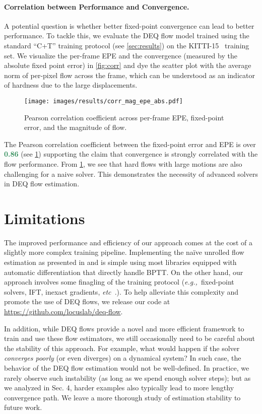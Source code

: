 \documentclass[10pt,twocolumn,letterpaper]{article}
\def\eg{\textit{e.g.,~}}
\def\etc{\textit{etc~}}
\begin{document}
\vspace{-.3cm}
\paragraph{Correlation between Performance and Convergence.} A potential question is whether better fixed-point convergence can lead to better performance. To tackle this, we evaluate the DEQ flow model trained using the standard ``C+T'' training protocol (see \cref{sec:results}) on the KITTI-15~\cite{kitti} training set. We visualize the per-frame EPE and the convergence (measured by the absolute fixed point error) in \cref{fig:corr} and dye the scatter plot with the average norm of per-pixel flow across the frame, which can be understood as an indicator of hardness due to the large displacements. 
\begin{figure}
    \centering
    \texttt{[image: images/results/corr\_mag\_epe\_abs.pdf]}
    \vspace{-0.3cm}
    \caption{Pearson correlation coefficient across per-frame EPE, fixed-point error, and the magnitude of flow.}
    \label{fig:pearson}
    \vspace{-0.4cm}
\end{figure}
The Pearson correlation coefficient between the fixed-point error and EPE is over \textcolor{SeaGreen}{\textbf{0.86}} (see \cref{fig:pearson}) supporting the claim that convergence is strongly correlated with the flow performance. From \cref{fig:pearson}, we see that hard flows with large motions are also challenging for a naive solver. This demonstrates the necessity of advanced solvers in DEQ flow estimation.

\vspace{-0.2cm}
\section{Limitations}
The improved performance and efficiency of our approach comes at the cost of a slightly more complex training pipeline. 
Implementing the na\"ive unrolled flow estimation as presented in \citet{RAFT} and \citet{GMA} is simple using most libraries equipped with automatic differentiation that directly handle BPTT.
On the other hand, our approach involves some finagling of the training protocol (\eg fixed-point solvers, IFT, inexact gradients, \etc.). To help alleviate this complexity and promote the use of DEQ flows, we release our code at \url{https://github.com/locuslab/deq-flow}.

In addition, while DEQ flows provide a novel and more efficient framework to train and use these flow estimators, we still occasionally need to be careful about the stability of this approach. For example, what would happen if the solver \emph{converges poorly} (or even diverges) on a dynamical system? In such case, the behavior of the DEQ flow estimation would not be well-defined. In practice, we rarely observe such instability (as long as we spend enough solver steps); but as we analyzed in Sec. 4, harder examples also typically lead to more lengthy convergence path. We leave a more thorough study of estimation stability to future work.
\end{document}
